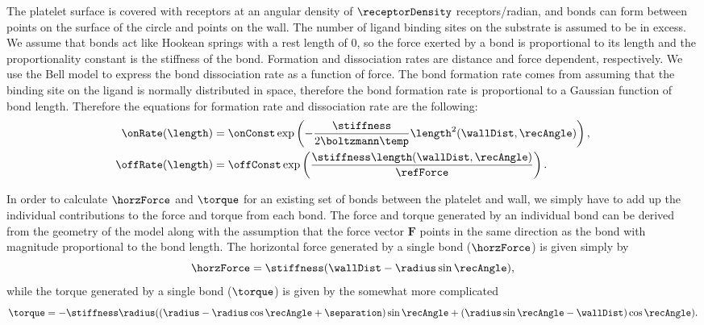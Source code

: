 The platelet surface is covered with receptors at an angular density
of $\receptorDensity$ receptors/radian, and bonds can form between
points on the surface of the circle and points on the wall. The number
of ligand binding sites on the substrate is assumed to be in
excess. We assume that bonds act like Hookean springs with a rest
length of 0, so the force exerted by a bond is proportional to its
length and the proportionality constant is the stiffness of the
bond. Formation and dissociation rates are distance and force
dependent, respectively. We use the Bell model \cite{Bell1978} to
express the bond dissociation rate as a function of force. The bond
formation rate comes from assuming that the binding site on the ligand
is normally distributed in space, therefore the bond formation rate is
proportional to a Gaussian function of bond length. Therefore the
equations for formation rate and dissociation rate are the following:
\begin{align}
  \label{eq:binding}
  \onRate(\length) &= \onConst \exp
                     \left(-\frac{\stiffness}{2\boltzmann\temp}
                     \length^2(\wallDist, \recAngle) \right), \\
  \label{eq:unbinding}
  \offRate(\length) &= \offConst \exp \left( \frac{\stiffness
                      \length(\wallDist, \recAngle)}{\refForce} \right).
\end{align}

In order to calculate $\horzForce$ and $\torque$ for an existing set
of bonds between the platelet and wall, we simply have to add up the
individual contributions to the force and torque from each bond. The
force and torque generated by an individual bond can be derived from
the geometry of the model along with the assumption that the force
vector $\mathbf{F}$ points in the same direction as the bond with
magnitude proportional to the bond length. The horizontal force
generated by a single bond ($\horzForce$) is given simply by
\begin{equation}
  \label{eq:horz-force}
  \horzForce = \stiffness (\wallDist - \radius\sin\recAngle),
\end{equation}
while the torque generated by a single bond ($\torque$) is given by
the somewhat more complicated
\begin{equation}
  \label{eq:torque}
  \torque = -\stiffness \radius ((\radius - \radius\cos\recAngle +
  \separation)\sin\recAngle + (\radius\sin\recAngle -
  \wallDist)\cos\recAngle).
\end{equation}

